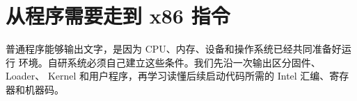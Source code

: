 \chapter{从程序需要走到 x86 指令}

普通程序能够输出文字，是因为 CPU、内存、设备和操作系统已经共同准备好运行
环境。自研系统必须自己建立这些条件。我们先沿一次输出区分固件、Loader、
Kernel 和用户程序，再学习读懂后续启动代码所需的 Intel 汇编、寄存器和机器码。










